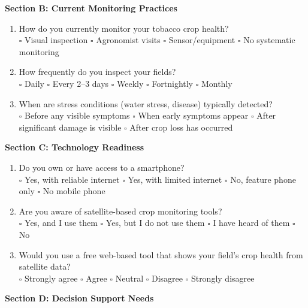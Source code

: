 \documentclass[12pt,a4paper]{report}
\begin{document}
\noindent\textbf{Section B: Current Monitoring Practices}

\begin{enumerate}[resume]
  \item How do you currently monitor your tobacco crop health?\\
  $\square$ Visual inspection \quad $\square$ Agronomist visits \quad $\square$ Sensor/equipment \quad $\square$ No systematic monitoring

  \item How frequently do you inspect your fields?\\
  $\square$ Daily \quad $\square$ Every 2--3 days \quad $\square$ Weekly \quad $\square$ Fortnightly \quad $\square$ Monthly

  \item When are stress conditions (water stress, disease) typically detected?\\
  $\square$ Before any visible symptoms \quad $\square$ When early symptoms appear \quad $\square$ After significant damage is visible \quad $\square$ After crop loss has occurred
\end{enumerate}

\noindent\textbf{Section C: Technology Readiness}

\begin{enumerate}[resume]
  \item Do you own or have access to a smartphone?\\
  $\square$ Yes, with reliable internet \quad $\square$ Yes, with limited internet \quad $\square$ No, feature phone only \quad $\square$ No mobile phone

  \item Are you aware of satellite-based crop monitoring tools?\\
  $\square$ Yes, and I use them \quad $\square$ Yes, but I do not use them \quad $\square$ I have heard of them \quad $\square$ No

  \item Would you use a free web-based tool that shows your field's crop health from satellite data?\\
  $\square$ Strongly agree \quad $\square$ Agree \quad $\square$ Neutral \quad $\square$ Disagree \quad $\square$ Strongly disagree
\end{enumerate}

\noindent\textbf{Section D: Decision Support Needs}
\end{document}
